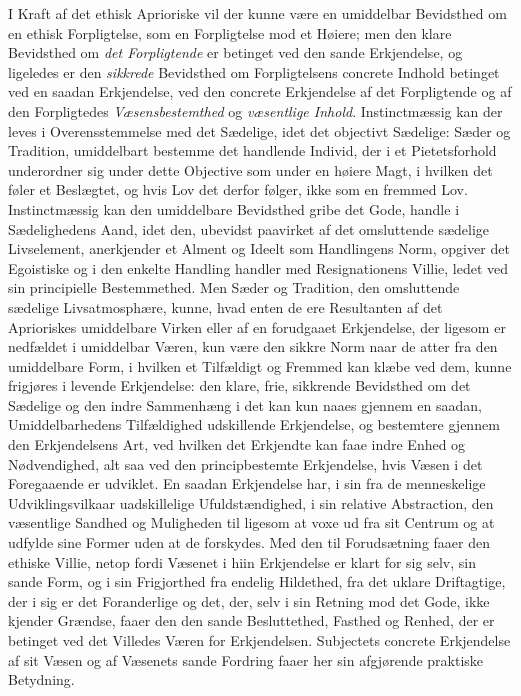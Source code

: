 I Kraft af det ethisk Aprioriske vil der kunne være en umiddelbar Bevidsthed om
en ethisk Forpligtelse, som en Forpligtelse mod et Høiere; men den klare
Bevidsthed om \emph{det Forpligtende} er betinget ved den sande Erkjendelse, og
ligeledes er den \emph{sikkrede} Bevidsthed om Forpligtelsens concrete Indhold
betinget ved en saadan Erkjendelse, ved den concrete Erkjendelse af det
Forpligtende og af den Forpligtedes \emph{Væsensbestemthed} og \emph{væsentlige
Inhold}.
Instinctmæssig kan der leves i Overensstemmelse med det Sædelige, idet det
objectivt Sædelige: Sæder og Tradition, umiddelbart bestemme det handlende
Individ, der i et Pietetsforhold underordner sig under dette Objective som under
en høiere Magt, i hvilken det føler et Beslægtet, og hvis Lov det derfor følger,
ikke som en fremmed Lov. Instinctmæssig kan den umiddelbare Bevidsthed gribe det
Gode, handle i Sædelighedens Aand, idet den, ubevidst paavirket af det
omsluttende sædelige Livselement, anerkjender et Alment og Ideelt som
Handlingens Norm, opgiver det Egoistiske og i den enkelte Handling handler med
Resignationens Villie, ledet ved sin principielle Bestemmethed. Men Sæder og
Tradition, den omsluttende sædelige Livsatmosphære, kunne, hvad enten de ere
Resultanten af det Aprioriskes umiddelbare Virken eller af en forudgaaet
Erkjendelse, der ligesom er nedfældet i umiddelbar Væren, kun være den sikkre
Norm naar de atter fra den umiddelbare Form, i hvilken et Tilfældigt og Fremmed
kan klæbe ved dem, kunne frigjøres i levende Erkjendelse: den klare, frie,
sikkrende Bevidsthed om det Sædelige og den indre Sammenhæng i det kan kun naaes
gjennem en saadan, Umiddelbarhedens Tilfældighed udskillende Erkjendelse, og
bestemtere gjennem den Erkjendelsens Art, ved hvilken det Erkjendte kan faae
indre Enhed og Nødvendighed, alt%
saa ved den principbestemte Erkjendelse, hvis Væsen i det Foregaaende er
udviklet. En saadan Erkjendelse har, i sin fra de menneskelige Udviklingsvilkaar
uadskillelige Ufuldstændighed, i sin relative Abstraction, den væsentlige
Sandhed og Muligheden til ligesom at voxe ud fra sit Centrum og at udfylde sine
Former uden at de forskydes. Med den til Forudsætning faaer den ethiske Villie,
netop fordi Væsenet i hiin Erkjendelse er klart for sig selv, sin sande Form, og
i sin Frigjorthed fra endelig Hildethed, fra det uklare Driftagtige, der i sig
er det Foranderlige og det, der, selv i sin Retning mod det Gode, ikke kjender
Grændse, faaer den den sande Besluttethed, Fasthed og Renhed, der er betinget
ved det Villedes Væren for Erkjendelsen. Subjectets concrete Erkjendelse af sit
Væsen og af Væsenets sande Fordring faaer her sin afgjørende praktiske
Betydning.


